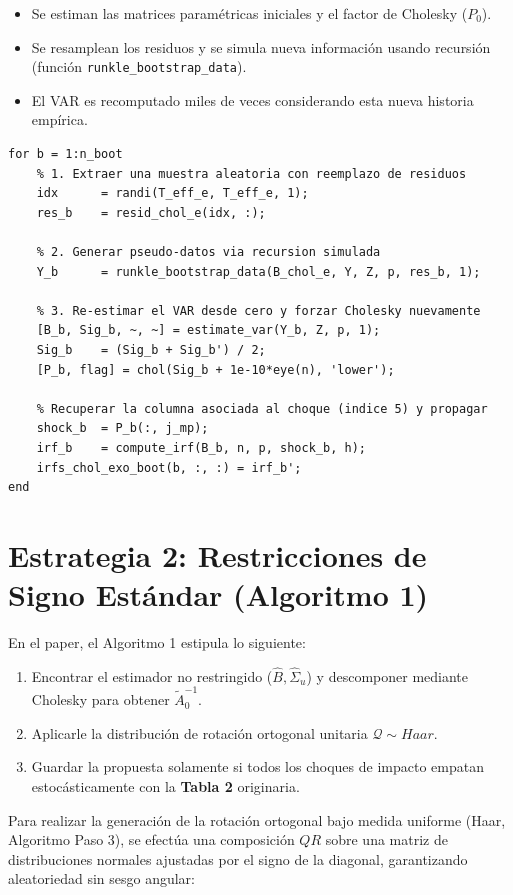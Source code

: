\documentclass[11pt,a4paper]{article}
\begin{document}
\begin{itemize}
    \item Se estiman las matrices paramétricas iniciales y el factor de Cholesky ($P_0$).
    \item Se resamplean los residuos y se simula nueva información usando recursión (función \texttt{runkle\_bootstrap\_data}).
    \item El VAR es recomputado miles de veces considerando esta nueva historia empírica.
\end{itemize}

\begin{lstlisting}[caption={Fragmento de Código - Bootstrap de Runkle para Cholesky}]
for b = 1:n_boot
    % 1. Extraer una muestra aleatoria con reemplazo de residuos
    idx      = randi(T_eff_e, T_eff_e, 1);
    res_b    = resid_chol_e(idx, :);
    
    % 2. Generar pseudo-datos via recursion simulada
    Y_b      = runkle_bootstrap_data(B_chol_e, Y, Z, p, res_b, 1);
    
    % 3. Re-estimar el VAR desde cero y forzar Cholesky nuevamente
    [B_b, Sig_b, ~, ~] = estimate_var(Y_b, Z, p, 1);
    Sig_b    = (Sig_b + Sig_b') / 2;
    [P_b, flag] = chol(Sig_b + 1e-10*eye(n), 'lower');
    
    % Recuperar la columna asociada al choque (indice 5) y propagar
    shock_b  = P_b(:, j_mp);
    irf_b    = compute_irf(B_b, n, p, shock_b, h);
    irfs_chol_exo_boot(b, :, :) = irf_b';
end
\end{lstlisting}

\section{Estrategia 2: Restricciones de Signo Estándar (Algoritmo 1)}
En el paper, el Algoritmo 1 estipula lo siguiente:
\begin{enumerate}
    \item Encontrar el estimador no restringido ($\hat{B}, \hat{\Sigma}_u$) y descomponer mediante Cholesky para obtener $\tilde{A}_0^{-1}$.
    \item Aplicarle la distribución de rotación ortogonal unitaria $\mathcal{Q} \sim Haar$.
    \item Guardar la propuesta solamente si todos los choques de impacto empatan estocásticamente con la \textbf{Tabla 2} originaria.
\end{enumerate}

Para realizar la generación de la rotación ortogonal bajo medida uniforme (Haar, Algoritmo Paso 3), se efectúa una composición $QR$ sobre una matriz de distribuciones normales ajustadas por el signo de la diagonal, garantizando aleatoriedad sin sesgo angular:
\end{document}
